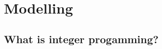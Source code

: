 \section{Modelling} %
\label{sec:modelling}
\subsection{What is integer progamming?} %
\label{sub:what_is_integer_progamming_}

